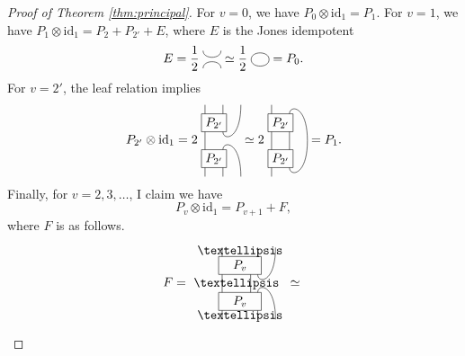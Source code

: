 \documentclass[10pt,a4paper]{amsart}
\newcommand{\id}{\mathrm{id}}
\begin{document}
\begin{proof}[Proof of Theorem \ref{thm:principal}]
For $v=0$, we have $P_0 \otimes \id_1 = P_1$.
For $v=1$, we have $P_1 \otimes \mathrm{id}_1 = P_2 + P_{2'} + E$,
where $E$ is the Jones idempotent
$$
E=
\frac12\;
\begin{tikzpicture}[baseline=-0.5ex,scale=0.05]
\draw (-5,-5) .. controls (-5,0) and (5,0) .. (5,-5);
\draw (-5,5) .. controls (-5,0) and (5,0) .. (5,5);
\end{tikzpicture}
\simeq
\frac12\;
\begin{tikzpicture}[baseline=-0.5ex,scale=0.05]
\draw (-5,0) .. controls (-5,5) and (5,5) .. (5,0)
             .. controls (5,-5) and (-5,-5) .. (-5,0);
\end{tikzpicture}
= P_0.
$$
For $v=2'$, the leaf relation implies
\[
P_{2'} \otimes \mathrm{id}_1
=2\;
\begin{tikzpicture}[baseline=-0.5ex,scale=0.05]
\node at (-5,10) {$P_{2'}$};
\draw (-12,5) rectangle (2,15);
\node at (-5,-10) {$P_{2'}$};
\draw (-12,-15) rectangle (2,-5);
\draw (-10,-20) -- (-10,-15);
\draw (-10,-5) -- (-10,5);
\draw (-10,15) -- (-10,20);
\draw (0,-20) -- (0,-15);
\draw (0,-5) .. controls (0,0) and (10,0) .. (10,-20);
\draw (0,5) .. controls (0,0) and (10,0) .. (10,20);
\draw (0,15) -- (0,20);
\end{tikzpicture}
\simeq
2\;
\begin{tikzpicture}[baseline=-0.5ex,scale=0.05]
\node at (-5,10) {$P_{2'}$};
\draw (-12,5) rectangle (2,15);
\node at (-5,-10) {$P_{2'}$};
\draw (-12,-15) rectangle (2,-5);
\draw (-10,-20) -- (-10,-15);
\draw (-10,-5) -- (-10,5);
\draw (-10,15) -- (-10,20);
\draw (0,-15) .. controls (0,-20) and (10,-20) .. (10,0)
              .. controls (10,20) and (0,20) .. (0,15);
\draw (0,-5) -- (0,5);
\end{tikzpicture}
=P_1.
\]
Finally, for $v=2,3,\dots$, I claim we have
$$P_v \otimes \mathrm{id}_1 = P_{v+1} + F,$$
where $F$ is as follows.
\[
F=
\begin{tikzpicture}[baseline=-0.5ex,scale=0.05]
\node at (-10,10) {$P_v$};
\draw (-22,5) rectangle (2,15);
\node at (-10,-10) {$P_v$};
\draw (-22,-15) rectangle (2,-5);
\draw (-20,-5) -- (-20,5);
\node at (-12,0) {$\dots$};
\draw (-4,-5) -- (-4,5);
\draw (0,-5) .. controls (0,0) and (10,0) .. (10,-20);
\draw (0,5) .. controls (0,0) and (10,0) .. (10,20);
\draw (-20,-20) -- (-20,-15);
\node at (-10,-18) {$\dots$};
\draw (0,-20) -- (0,-15);
\draw (-20,15) -- (-20,20);
\node at (-10,18) {$\dots$};
\draw (0,15) -- (0,20);
\end{tikzpicture}
\simeq
\begin{tikzpicture}[baseline=-0.5ex,scale=0.05]

\end{tikzpicture}\]
\end{proof}
\end{document}
